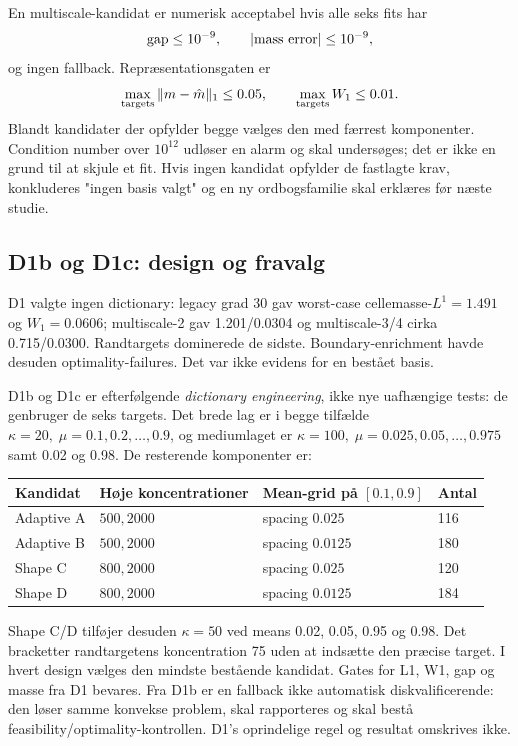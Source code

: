 En multiscale-kandidat er numerisk acceptabel hvis alle seks fits har
\[
 {\rm gap}\le10^{-9},\qquad
 |\text{mass error}|\le10^{-9},
\]
og ingen fallback. Repræsentationsgaten er
\[
 \max_{\rm targets}\|m-\hat m\|_1\le0.05,\qquad
 \max_{\rm targets}W_1\le0.01.
\]
Blandt kandidater der opfylder begge vælges den med færrest komponenter.
Condition number over \(10^{12}\) udløser en alarm og skal undersøges; det er
ikke en grund til at skjule et fit. Hvis ingen kandidat opfylder de fastlagte
krav, konkluderes "ingen basis valgt" og en ny ordbogsfamilie skal erklæres
før næste studie.



\subsection{D1b og D1c: design og fravalg}
D1 valgte ingen dictionary: legacy grad 30 gav worst-case cellemasse-\(L^1=1.491\)
og \(W_1=0.0606\); multiscale-2 gav 1.201/0.0304 og multiscale-3/4 cirka
0.715/0.0300. Randtargets dominerede de sidste. Boundary-enrichment havde desuden
optimality-failures. Det var ikke evidens for en bestået basis.

D1b og D1c er efterfølgende \emph{dictionary engineering}, ikke nye uafhængige tests:
de genbruger de seks targets. Det brede lag er i begge tilfælde
\(\kappa=20,\;\mu=0.1,0.2,\ldots,0.9\), og mediumlaget er
\(\kappa=100,\;\mu=0.025,0.05,\ldots,0.975\) samt 0.02 og 0.98.
De resterende komponenter er:
\begin{center}
\begin{tabular}{llll}
\toprule
Kandidat & Høje koncentrationer & Mean-grid på $[0.1,0.9]$ & Antal \\
\midrule
Adaptive A & $500,2000$ & spacing $0.025$ & 116 \\
Adaptive B & $500,2000$ & spacing $0.0125$ & 180 \\
Shape C & $800,2000$ & spacing $0.025$ & 120 \\
Shape D & $800,2000$ & spacing $0.0125$ & 184 \\
\bottomrule
\end{tabular}
\end{center}
Shape C/D tilføjer desuden \(\kappa=50\) ved means 0.02, 0.05, 0.95 og 0.98.
Det bracketter randtargetens koncentration 75 uden at indsætte den præcise target.
I hvert design vælges den mindste bestående kandidat. Gates for L1, W1, gap og masse
fra D1 bevares. Fra D1b er en fallback ikke automatisk diskvalificerende: den løser
samme konvekse problem, skal rapporteres og skal bestå feasibility/optimality-kontrollen.
D1's oprindelige regel og resultat omskrives ikke.

